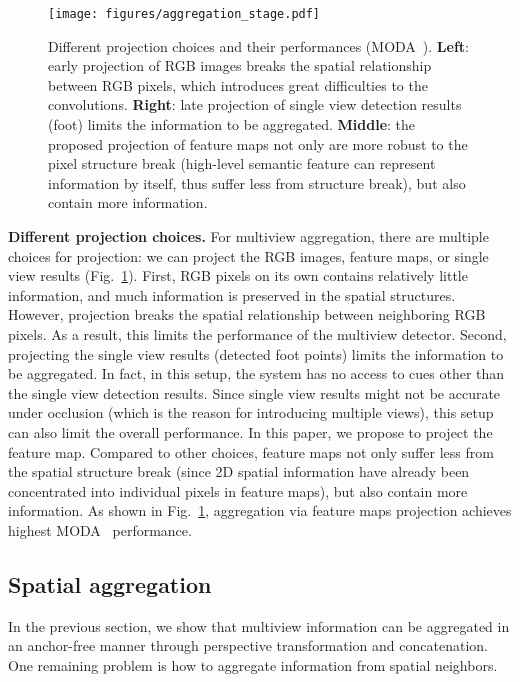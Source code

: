 \documentclass[runningheads]{llncs}
\begin{document}
\begin{figure}[t]
    \centering
    \texttt{[image: figures/aggregation\_stage.pdf]}
    \caption{Different projection choices and their performances (MODA~\cite{kasturi2008framework}). \textbf{Left}: early projection of RGB images breaks the spatial relationship between RGB pixels, which introduces great difficulties to the convolutions. \textbf{Right}: late projection of single view detection results (foot) limits the information to be aggregated. \textbf{Middle}: the proposed projection of feature maps not only are more robust to the pixel structure break (high-level semantic feature can represent information by itself, thus suffer less from structure break), but also contain more information. 
    }
    \label{fig:aggregation_stage}
\end{figure}



\textbf{Different projection choices. }
For multiview aggregation, there are multiple choices for projection: we can project the RGB images, feature maps, or single view results (Fig.~\ref{fig:aggregation_stage}). 
First, RGB pixels on its own contains relatively little information, and much information is preserved in the spatial structures. However, projection breaks the spatial relationship between neighboring RGB pixels. As a result, this limits the performance of the multiview detector. 
Second, projecting the single view results (detected foot points) limits the information to be aggregated. In fact, in this setup, the system has no access to cues other than the single view detection results. Since single view results might not be accurate under occlusion (which is the reason for introducing multiple views), this setup can also limit the overall performance. 
In this paper, we propose to project the feature map. Compared to other choices, feature maps not only suffer less from the spatial structure break (since 2D spatial information have already been concentrated into individual pixels in feature maps), but also contain more information. As shown in Fig.~\ref{fig:aggregation_stage}, aggregation via feature maps projection achieves highest MODA~\cite{kasturi2008framework} performance. 






\subsection{Spatial aggregation}
\label{sec:sec:joint}
In the previous section, we show that multiview information can be aggregated in an anchor-free manner through perspective transformation and concatenation. One remaining problem is how to aggregate information from spatial neighbors. 
\end{document}

